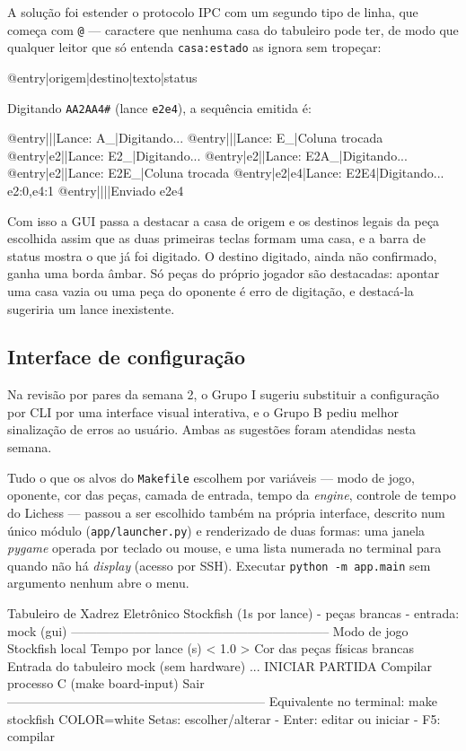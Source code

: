 \documentclass[12pt,a4paper]{article}
\begin{document}
A solução foi estender o protocolo IPC com um segundo tipo de linha, que
começa com \texttt{@} --- caractere que nenhuma casa do tabuleiro pode ter, de
modo que qualquer leitor que só entenda \texttt{casa:estado} as ignora sem
tropeçar:

\begin{terminal}
@entry|origem|destino|texto|status
\end{terminal}

\noindent
Digitando \texttt{AA2AA4\#} (lance \texttt{e2e4}), a sequência emitida é:

\begin{terminal}
@entry|||Lance: A_|Digitando...
@entry|||Lance: E_|Coluna trocada
@entry|e2||Lance: E2_|Digitando...
@entry|e2||Lance: E2A_|Digitando...
@entry|e2||Lance: E2E_|Coluna trocada
@entry|e2|e4|Lance: E2E4|Digitando...
e2:0,e4:1
@entry||||Enviado e2e4
\end{terminal}

Com isso a GUI passa a destacar a casa de origem e os destinos legais da peça
escolhida assim que as duas primeiras teclas formam uma casa, e a barra de
status mostra o que já foi digitado. O destino digitado, ainda não confirmado,
ganha uma borda âmbar. Só peças do próprio jogador são destacadas: apontar uma
casa vazia ou uma peça do oponente é erro de digitação, e destacá-la sugeriria
um lance inexistente.

\subsection{Interface de configuração}
\label{sec:menu}

Na revisão por pares da semana 2, o Grupo I sugeriu substituir a configuração
por CLI por uma interface visual interativa, e o Grupo B pediu melhor
sinalização de erros ao usuário. Ambas as sugestões foram atendidas nesta
semana.

Tudo o que os alvos do \texttt{Makefile} escolhem por variáveis --- modo de
jogo, oponente, cor das peças, camada de entrada, tempo da \emph{engine},
controle de tempo do Lichess --- passou a ser escolhido também na própria
interface, descrito num único módulo (\texttt{app/launcher.py}) e renderizado
de duas formas: uma janela \emph{pygame} operada por teclado ou mouse, e uma
lista numerada no terminal para quando não há \emph{display} (acesso por SSH).
Executar \texttt{python -m app.main} sem argumento nenhum abre o menu.

\begin{terminal}
Tabuleiro de Xadrez Eletrônico
Stockfish (1s por lance) - peças brancas - entrada: mock (gui)
--------------------------------------------------------------
  Modo de jogo                          Stockfish local
  Tempo por lance (s)              <       1.0       >
  Cor das peças físicas                          brancas
  Entrada do tabuleiro               mock (sem hardware)
  ...
  INICIAR PARTIDA
  Compilar processo C (make board-input)
  Sair
--------------------------------------------------------------
Equivalente no terminal: make stockfish COLOR=white
Setas: escolher/alterar - Enter: editar ou iniciar - F5: compilar
\end{terminal}
\end{document}
